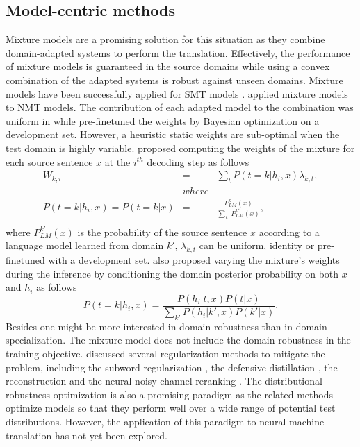 \subsection{Model-centric methods}
Mixture models are a promising solution for this situation as they combine domain-adapted systems to perform the translation. Effectively, the performance of mixture models is guaranteed in the source domains while using a convex combination of the adapted systems is robust against unseen domains. Mixture models have been successfully applied for SMT models \citep{Sennrich12mixture,Sennrich12perplexity,Carpuat14linear}. \citet{Freitag16fast, Sajjad17neural, Saunders19domain} applied mixture models to NMT models. The contribution of each adapted model to the combination was uniform in \citet{Freitag16fast} while \citet{Sajjad17neural} pre-finetuned the weights by Bayesian optimization on a development set. However, a heuristic static weights are sub-optimal when the test domain is highly variable. \citet{Saunders19domain} proposed computing the weights of the mixture for each source sentence $x$ at the $i^{th}$ decoding step as follows
\begin{equation}
\begin{array}{rcl}
W_{k,i} &=& \displaystyle{\mathop{\sum}_{t} P(t=k|h_i,x)\lambda_{k,t}}, \\
&where& \\
P(t=k|h_i,x) = P(t=k|x) &=& \frac{\displaystyle{P^k_{LM}(x)}}{\displaystyle{\mathop{\sum}_{k'} P^{k'}_{LM}(x)}},\\
\end{array}
\end{equation}
where $P^{k'}_{LM}(x)$ is the probability of the source sentence $x$ according to a language model learned from domain $k'$, $\lambda_{k,t}$ can be uniform, identity or pre-finetuned with a development set. \citet{Saunders19domain} also proposed varying the mixture's weights during the inference by conditioning the domain posterior probability on both $x$ and $h_i$ as follows
\begin{equation}
P(t=k|h_i,x) = \frac{P(h_i|t,x) P(t|x)}{\displaystyle{\mathop{\sum}_{k'} P(h_i|k',x) P(k'|x)}}.
\end{equation} 
Besides one might be more interested in domain robustness than in domain specialization. The mixture model does not include the domain robustness in the training objective. \citet{Muller20domain} discussed several regularization methods to mitigate the problem, including the subword regularization \citep{Taku18subword}, the defensive distillation \citep{Papernot16distillation}, the reconstruction \citep{Tu17neural} and the neural noisy channel reranking \citep{Li16mutual}. The distributional robustness optimization \citep{BenTal13robust,Oren19distributionally} is also a promising paradigm as the related methods optimize models so that they perform well over a wide range of potential test distributions. However, the application of this paradigm to neural machine translation has not yet been explored.
